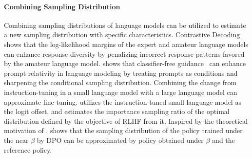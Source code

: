 

\paragraph{Combining Sampling Distribution}
Combining sampling distributions of language models can be utilized to estimate a new sampling distribution with specific characteristics. Contrastive Decoding~\cite{li2022contrastive} shows that the log-likelihood margins of the expert and amateur language models can enhance response diversity by penalizing incorrect response patterns favored by the amateur language model. \citet{sanchez2023stay} shows that classifier-free guidance~\cite{ho2022classifier} can enhance prompt relativity in language modeling by treating prompts as conditions and sharpening the conditional sampling distribution. Combining the change from instruction-tuning in a small language model with a large language model can approximate fine-tuning. \citet{liu2024tuning} utilizes the instruction-tuned small language model as the logit offset, and \citet{mitchell2023emulator} estimates the importance sampling ratio of the optimal distribution defined by the objective of RLHF from it. Inspired by the theoretical motivation of \citet{mitchell2023emulator}, \citet{liu2024decoding} shows that the sampling distribution of the policy trained under the near $\beta$ by DPO can be approximated by policy obtained under $\beta$ and the reference policy.

